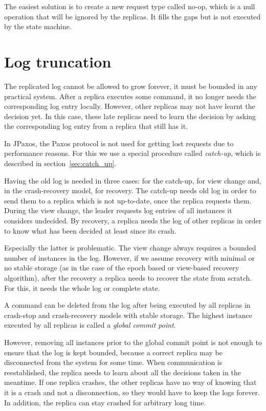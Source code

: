 The easiest solution is to create a new request type called no-op, which is a null operation that will be ignored by the replicas. It fills the gaps but is not executed by the state machine.

\section{Log truncation}

The replicated log cannot be allowed to grow forever, it must be bounded in any practical system. After a replica executes some command, it no longer needs the corresponding log entry locally. However, other replicas may not have learnt the decision yet. \linebreak In this case, these late replicas need to learn the decision by asking the corresponding log entry from a replica that still has it.

In JPaxos, the Paxos protocol is not used for getting lost requests due to performance reasons. For this we use a special procedure called \textit{catch-up}, which is described in section~\ref{sec:catch_up}.

Having the old log is needed in three cases: for the catch-up, for view change and, in the crash-recovery model, for recovery.
The catch-up needs old log in order to send them to a replica which is not up-to-date, once the replica requests them.
During the view change, the leader requests log entries of all instances it considers undecided.
By recovery, a replica needs the log of other replicas in order to know what has been decided at least since its crash.

Especially the latter is problematic. The view change always requires a bounded number of instances in the log. However, if we assume recovery with minimal or no stable storage (as in the case of the epoch based or view-based recovery algorithm), after the recovery a replica needs to recover the state from scratch. For this, it needs the whole log or complete state.


A command can be deleted from the log after being executed by all replicas in crash-stop and crash-recovery models with stable storage. The highest instance executed by all replicas is called a \emph{global commit point}.

However, removing all instances prior to the global commit point is not enough to ensure that the log is kept bounded, because a correct replica may be disconnected from the system for some time. When communication is reestablished, the replica needs to learn about all the decisions taken in the meantime. If one replica crashes, the other replicas have no way of knowing that it is a crash and not a disconnection, so they would have to keep the logs forever. In addition, the replica can stay crashed for arbitrary long time.

